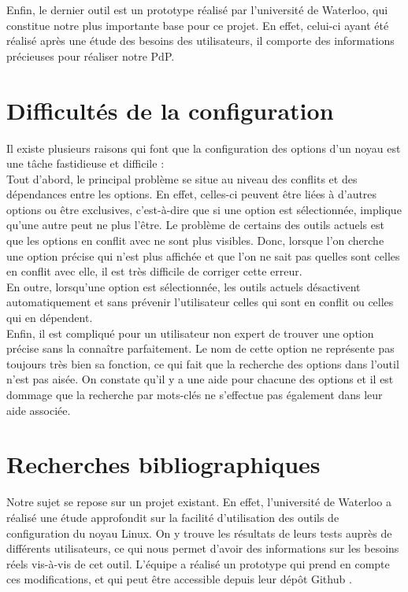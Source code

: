 \documentclass[17pts]{report}
\begin{document}
Enfin, le dernier outil est un prototype réalisé par l'université de Waterloo,
qui constitue notre plus importante base pour ce projet. En effet, celui-ci
ayant été réalisé après une étude des besoins des utilisateurs, il comporte des
informations précieuses pour réaliser notre PdP.  \\

\pagebreak

\section{Difficultés de la configuration}
\label{sec:Difficultés de la configuration}
Il existe plusieurs raisons qui font que la configuration des options d’un
noyau est une tâche fastidieuse et difficile : \\

Tout d’abord, le principal problème se situe au niveau des conflits et des
dépendances entre les options. En effet, celles-ci peuvent être liées à
d’autres options ou être exclusives, c’est-à-dire que si une option est
sélectionnée, implique qu'une autre peut ne plus l’être.  Le problème de
certains des outils actuels est que les options en conflit avec ne sont plus
visibles. Donc, lorsque l’on cherche une option précise qui n’est plus affichée
et que l’on ne sait pas quelles sont celles en conflit avec elle, il est très
difficile de corriger cette erreur.  \\

En outre, lorsqu'une option est sélectionnée, les outils actuels désactivent
automatiquement et sans prévenir l'utilisateur celles qui sont en conflit ou
celles qui en dépendent.  \\

Enfin, il est compliqué pour un utilisateur non expert de trouver une option
précise sans la connaître parfaitement. Le nom de cette option ne représente
pas toujours très bien sa fonction, ce qui fait que la recherche des options
dans l’outil n’est pas aisée.  On constate qu’il y a une aide pour chacune des
options et il est dommage que la recherche par mots-clés ne s’effectue pas
également dans leur aide associée.

\section{Recherches bibliographiques}
\label{sec:Recherches bibliographiques}
Notre sujet se repose sur un projet existant. En effet, l'université de
Waterloo a réalisé une étude approfondit \cite{Waterloo:Etude} sur la facilité
d'utilisation des outils de configuration du noyau Linux. On y trouve les
résultats de leurs tests auprès de différents utilisateurs, ce qui nous permet
d'avoir des informations sur les besoins réels vis-à-vis de cet outil. L'équipe
a réalisé un prototype qui prend en compte ces modifications, et qui peut
être accessible depuis leur dépôt Github \cite{Waterloo:Github}.  \\
\end{document}
